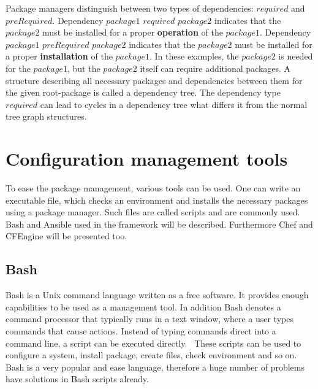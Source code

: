 Package managers distinguish between two types of dependencies: $required$ and $preRequired$. %
Dependency $package1$ \textbf{$required$} $package2$ indicates that the $package2$ must be installed for a proper \textbf{operation} of the $package1$. %
Dependency $package1$ \textbf{$preRequired$} $package2$ indicates that the $package2$ must be installed for a proper \textbf{installation} of the $package1$. %
In these examples, the $package2$ is needed for the $package1$, but the $package2$ itself can require additional packages.
A structure describing all necessary packages and dependencies between them for the given root-package is called a dependency tree. 
The dependency type $required$ can lead to cycles in a dependency tree what differs it from the normal tree graph structures.

\section{Configuration management tools}
To ease the package management, various tools can be used. 
One can write an executable file, which checks an environment and installs the necessary packages using a package manager.
Such files are called scripts and are commonly used.
Bash and Ansible used in the framework will be described.
Furthermore Chef and CFEngine will be presented too.

\subsection*{Bash} \label{lang:bash}
Bash is a Unix command language written as a free software.
It provides enough capabilities to be used as a  management tool.
In addition Bash denotes a command processor that typically runs in a text window, where a user types commands that cause actions.
Instead of typing commands direct into a command line, a script can be executed directly.~\cite{bash}
These scripts can be used to configure a system, install package, create files, check environment and so on.
Bash is a very popular and ease language, therefore a huge number of problems have solutions in Bash scripts already.

